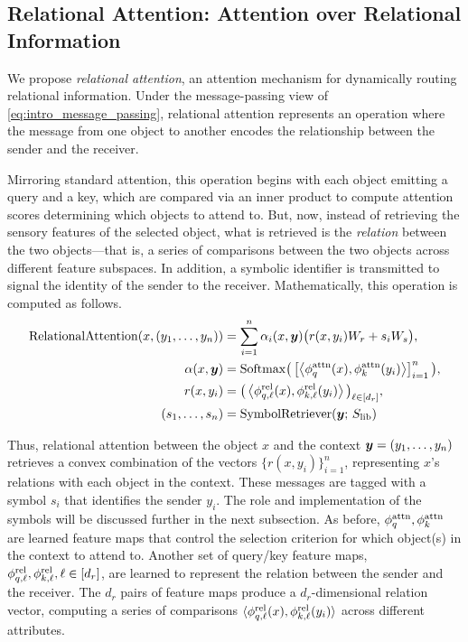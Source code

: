 \subsection{Relational Attention: Attention over Relational Information}

We propose \textit{relational attention}, an attention mechanism for dynamically routing relational information. Under the message-passing view of \cref{eq:intro_message_passing}, relational attention represents an operation where the message from one object to another encodes the relationship between the sender and the receiver.

Mirroring standard attention, this operation begins with each object emitting a query and a key, which are compared via an inner product to compute attention scores determining which objects to attend to. But, now, instead of retrieving the sensory features of the selected object, what is retrieved is the \textit{relation} between the two objects---that is, a series of comparisons between the two objects across different feature subspaces. In addition, a symbolic identifier is transmitted to signal the identity of the sender to the receiver. Mathematically, this operation is computed as follows.
\begin{equation}\label{eq:rel_attn}
  \begin{split}
    \mathrm{RelationalAttention}(x, (y_1, \ldots, y_n)) &= \sum_{i=1}^{n} \alpha_i(x, \bm{y}) \big(r(x, y_i) W_r + s_i W_s\big), \\
    \alpha(x, \bm{y}) &= \mathrm{Softmax}\big(\left[\left \langle \phi_q^{\mathrm{attn}}(x), \phi_k^{\mathrm{attn}}(y_i) \right\rangle\right]_{i=1}^{n}\big), \\
    r(x, y_i) &= \big(\left \langle \phi_{q, \ell}^{\mathrm{rel}}(x), \phi_{k, \ell}^{\mathrm{rel}}(y_i) \right\rangle\big)_{\ell \in [d_r]}, \\
    (s_1, \ldots, s_n) &= \mathrm{SymbolRetriever}(\bm{y};\,S_\mathrm{lib})
  \end{split}
\end{equation}

Thus, relational attention between the object $x$ and the context $\bm{y} = (y_1, \ldots, y_n)$ retrieves a convex combination of the vectors $\{r(x, y_i)\}_{i=1}^{n}$, representing $x$'s relations with each object in the context. These messages are tagged with a symbol $s_i$ that identifies the sender $y_i$. The role and implementation of the symbols will be discussed further in the next subsection. As before, $\phi_q^{\mathrm{attn}}, \phi_k^{\mathrm{attn}}$ are learned feature maps that control the selection criterion for which object(s) in the context to attend to. Another set of query/key feature maps, $\phi_{q, \ell}^{\mathrm{rel}}, \phi_{k, \ell}^{\mathrm{rel}}, \ell \in [d_r]$, are learned to represent the relation between the sender and the receiver. The $d_r$ pairs of feature maps produce a $d_r$-dimensional relation vector, computing a series of comparisons $\langle \phi_{q, \ell}^{\mathrm{rel}}(x), \phi_{k, \ell}^{\mathrm{rel}}(y_i) \rangle$ across different attributes.

